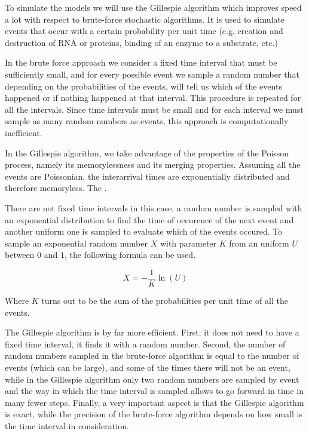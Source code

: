 To simulate the models we will use the Gillespie algorithm \cite{gillespie77} which improves speed a lot with respect to brute-force stochastic algorithms. It is used to simulate events that occur with a certain probability per unit time (e.g. creation and destruction of RNA or proteins, binding of an enzyme to a substrate, etc.)

In the brute force approach we consider a fixed time interval that must be sufficiently small, and for every possible event we sample a random number that depending on the probabilities of the events, will tell us which of the events happened or if nothing happened at that interval. This procedure is repeated for all the intervals. Since time intervals must be small and for each interval we must sample as many random numbers as events, this approach is computationally inefficient.

In the Gillespie algorithm, we take advantage of the properties of the Poisson process, namely its memorylessness and its merging properties. Assuming all the events are Poissonian, the interarrival times are exponentially distributed and therefore memoryless. The   \cite{bertsekas08}.

There are not fixed time intervals in this case, a random number is sampled with an exponential distribution to find the time of occurence of the next event and another uniform one is sampled to evaluate which of the events occured. To sample an exponential random number $X$ with parameter $K$ from an uniform $U$ between $0$ and $1$, the following formula can be used.

\begin{equation}
  X = -\frac{1}{K}\ln(U)
\end{equation}

Where $K$ turns out to be the sum of the probabilities per unit time of all the events. 

The Gillespie algorithm is by far more efficient. First, it does not need to have a fixed time interval, it finds it with a random number. Second, the number of random numbers sampled in the brute-force algorithm is equal to the number of events (which can be large), and some of the times there will not be an event, while in the Gillespie algorithm only two random numbers are sampled by event and the way in which the time interval is sampled allows to go forward in time in many fewer steps. Finally, a very important aspect is that the Gillespie algorithm is exact, while the precision of the brute-force algorithm depends on how small is the time interval in consideration.
